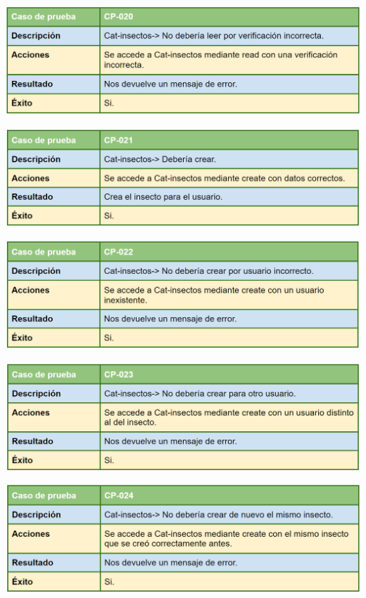 \bigskip

\includegraphics[width=\textwidth]{img/cap7/cp-020.png}

\bigskip

\includegraphics[width=\textwidth]{img/cap7/cp-021.png}

\bigskip

\includegraphics[width=\textwidth]{img/cap7/cp-022.png}

\bigskip

\includegraphics[width=\textwidth]{img/cap7/cp-023.png}

\bigskip

\includegraphics[width=\textwidth]{img/cap7/cp-024.png}

